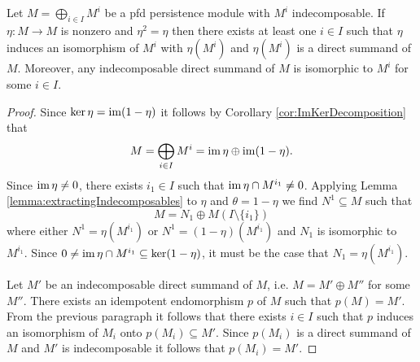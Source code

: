 \begin{lemma}\label{lemma:idempotentInduceIso}
    Let $M=\bigoplus_{i\in I}M^i$ be a pfd persistence module with $M^i$ indecomposable.
    If $\eta\colon M\to M$ is nonzero and $\eta^2=\eta$ then there exists at least one $i\in I$ such that $\eta$ induces an isomorphism of $M^i$ with $\eta(M^i)$ and $\eta(M^i)$ is a direct summand of $M$.
    Moreover, any indecomposable direct summand of $M$ is isomorphic to $M^i$ for some $i\in I$.
\end{lemma}
\begin{proof}
    Since $\ker\eta=\operatorname{im}(1-\eta)$ it follows by Corollary \ref{cor:ImKerDecomposition} that
    \[ M=\bigoplus_{i\in I}M^i=\operatorname{im}\eta\oplus\operatorname{im}(1-\eta).\]
    Since $\operatorname{im}\eta\neq 0$, there exists $i_1\in I$ such that $\operatorname{im} \eta\cap M^{i_1}\neq 0$.
    Applying Lemma \ref{lemma:extractingIndecomposables} to $\eta$ and $\theta=1-
    \eta$ we find $N^1\subseteq M$ such that 
    \[ M=N_1\oplus M(I\setminus\{i_1\}) \]
    where either $N^1=\eta(M^{i_1})$ or $N^1=(1-\eta)(M^{i_1})$ and $N_1$ is isomorphic to $M^{i_1}$.
    Since $0\neq \operatorname{im}\eta\cap M^{i_1}\subseteq\ker(1-\eta)$, it must be the case that $N_1=\eta(M^{i_1})$.
    
    Let $M'$ be an indecomposable direct summand of $M$, i.e. $M=M'\oplus M''$ for some $M''$. 
    There exists an idempotent endomorphism $p$ of $M$ such that $p(M)=M'$.
    From the previous paragraph it follows that there exists $i\in I$ such that $p$ induces an isomorphism of $M_i$ onto $p(M_i)\subseteq M'$.
    Since $p(M_i)$ is a direct summand of $M$ and $M'$ is indecomposable it follows that $p(M_i)=M'$.
\end{proof}

